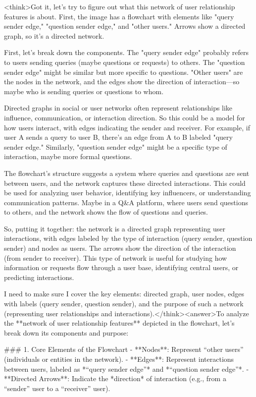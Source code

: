 <think>Got it, let's try to figure out what this network of user relationship features is about. First, the image has a flowchart with elements like "query sender edge," "question sender edge," and "other users." Arrows show a directed graph, so it's a directed network. 

First, let's break down the components. The "query sender edge" probably refers to users sending queries (maybe questions or requests) to others. The "question sender edge" might be similar but more specific to questions. "Other users" are the nodes in the network, and the edges show the direction of interaction—so maybe who is sending queries or questions to whom.

Directed graphs in social or user networks often represent relationships like influence, communication, or interaction direction. So this could be a model for how users interact, with edges indicating the sender and receiver. For example, if user A sends a query to user B, there's an edge from A to B labeled "query sender edge." Similarly, "question sender edge" might be a specific type of interaction, maybe more formal questions.

The flowchart's structure suggests a system where queries and questions are sent between users, and the network captures these directed interactions. This could be used for analyzing user behavior, identifying key influencers, or understanding communication patterns. Maybe in a Q&A platform, where users send questions to others, and the network shows the flow of questions and queries.

So, putting it together: the network is a directed graph representing user interactions, with edges labeled by the type of interaction (query sender, question sender) and nodes as users. The arrows show the direction of the interaction (from sender to receiver). This type of network is useful for studying how information or requests flow through a user base, identifying central users, or predicting interactions.

I need to make sure I cover the key elements: directed graph, user nodes, edges with labels (query sender, question sender), and the purpose of such a network (representing user relationships and interactions).</think><answer>To analyze the **network of user relationship features** depicted in the flowchart, let’s break down its components and purpose:  


### 1. Core Elements of the Flowchart  
- **Nodes**: Represent “other users” (individuals or entities in the network).  
- **Edges**: Represent interactions between users, labeled as *“query sender edge”* and *“question sender edge”*.  
- **Directed Arrows**: Indicate the *direction* of interaction (e.g., from a “sender” user to a “receiver” user).    


